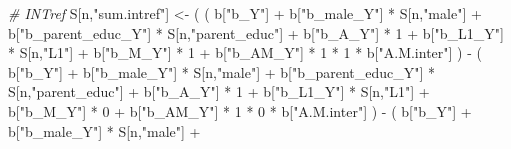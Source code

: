 \documentclass[
]{book}
\newenvironment{Shaded}{\begin{snugshade}}{\end{snugshade}}
\newcommand{\CommentTok}[1]{\textcolor[rgb]{0.56,0.35,0.01}{\textit{#1}}}
\newcommand{\DecValTok}[1]{\textcolor[rgb]{0.00,0.00,0.81}{#1}}
\newcommand{\NormalTok}[1]{#1}
\newcommand{\OtherTok}[1]{\textcolor[rgb]{0.56,0.35,0.01}{#1}}
\newcommand{\SpecialCharTok}[1]{\textcolor[rgb]{0.00,0.00,0.00}{#1}}
\newcommand{\StringTok}[1]{\textcolor[rgb]{0.31,0.60,0.02}{#1}}
\begin{document}
\begin{Shaded}
\begin{Highlighting}[]
    \CommentTok{\# INTref }
\NormalTok{    S[n,}\StringTok{"sum.intref"}\NormalTok{] }\OtherTok{\textless{}{-}}\NormalTok{ ( ( b[}\StringTok{"b\_Y"}\NormalTok{] }\SpecialCharTok{+} 
\NormalTok{                               b[}\StringTok{"b\_male\_Y"}\NormalTok{] }\SpecialCharTok{*}\NormalTok{ S[n,}\StringTok{"male"}\NormalTok{] }\SpecialCharTok{+} 
\NormalTok{                               b[}\StringTok{"b\_parent\_educ\_Y"}\NormalTok{] }\SpecialCharTok{*}\NormalTok{ S[n,}\StringTok{"parent\_educ"}\NormalTok{] }\SpecialCharTok{+} 
\NormalTok{                               b[}\StringTok{"b\_A\_Y"}\NormalTok{] }\SpecialCharTok{*} \DecValTok{1} \SpecialCharTok{+} 
\NormalTok{                               b[}\StringTok{"b\_L1\_Y"}\NormalTok{] }\SpecialCharTok{*}\NormalTok{ S[n,}\StringTok{"L1"}\NormalTok{] }\SpecialCharTok{+}
\NormalTok{                               b[}\StringTok{"b\_M\_Y"}\NormalTok{] }\SpecialCharTok{*} \DecValTok{1} \SpecialCharTok{+}
\NormalTok{                               b[}\StringTok{"b\_AM\_Y"}\NormalTok{] }\SpecialCharTok{*} \DecValTok{1} \SpecialCharTok{*} \DecValTok{1} \SpecialCharTok{*}\NormalTok{ b[}\StringTok{"A.M.inter"}\NormalTok{] ) }\SpecialCharTok{{-}} 
\NormalTok{                             ( b[}\StringTok{"b\_Y"}\NormalTok{] }\SpecialCharTok{+} 
\NormalTok{                                 b[}\StringTok{"b\_male\_Y"}\NormalTok{] }\SpecialCharTok{*}\NormalTok{ S[n,}\StringTok{"male"}\NormalTok{] }\SpecialCharTok{+} 
\NormalTok{                                 b[}\StringTok{"b\_parent\_educ\_Y"}\NormalTok{] }\SpecialCharTok{*}\NormalTok{ S[n,}\StringTok{"parent\_educ"}\NormalTok{] }\SpecialCharTok{+} 
\NormalTok{                                 b[}\StringTok{"b\_A\_Y"}\NormalTok{] }\SpecialCharTok{*} \DecValTok{1} \SpecialCharTok{+} 
\NormalTok{                                 b[}\StringTok{"b\_L1\_Y"}\NormalTok{] }\SpecialCharTok{*}\NormalTok{ S[n,}\StringTok{"L1"}\NormalTok{] }\SpecialCharTok{+}
\NormalTok{                                 b[}\StringTok{"b\_M\_Y"}\NormalTok{] }\SpecialCharTok{*} \DecValTok{0} \SpecialCharTok{+}
\NormalTok{                                 b[}\StringTok{"b\_AM\_Y"}\NormalTok{] }\SpecialCharTok{*} \DecValTok{1} \SpecialCharTok{*} \DecValTok{0} \SpecialCharTok{*}\NormalTok{ b[}\StringTok{"A.M.inter"}\NormalTok{] ) }\SpecialCharTok{{-}} 
\NormalTok{                             ( b[}\StringTok{"b\_Y"}\NormalTok{] }\SpecialCharTok{+} 
\NormalTok{                                 b[}\StringTok{"b\_male\_Y"}\NormalTok{] }\SpecialCharTok{*}\NormalTok{ S[n,}\StringTok{"male"}\NormalTok{] }\SpecialCharTok{+} 

\end{Highlighting}
\end{Shaded}
\end{document}
